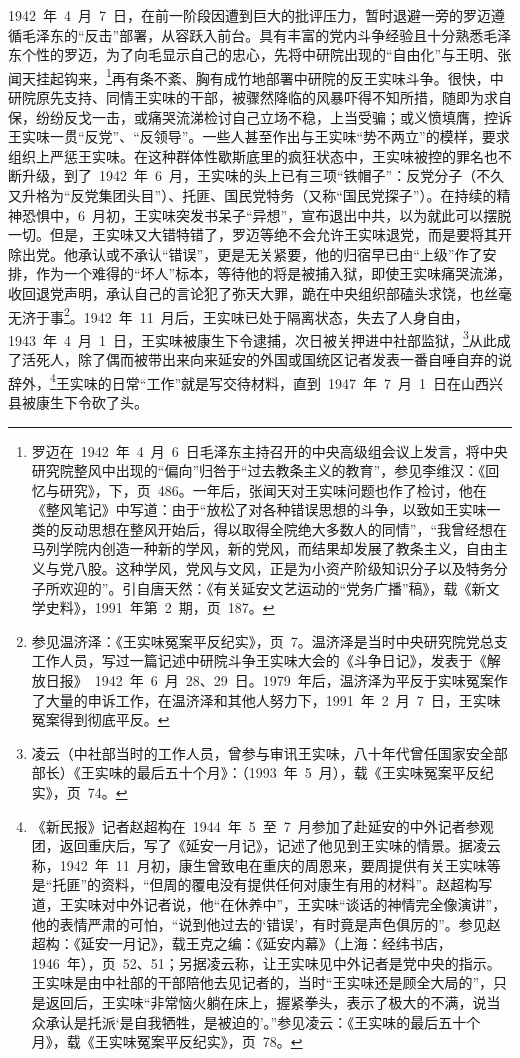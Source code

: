 1942~年~4~月~7~日，在前一阶段因遭到巨大的批评压力，暂时退避一旁的罗迈遵循毛泽东的“反击”部署，从容跃入前台。具有丰富的党内斗争经验且十分熟悉毛泽东个性的罗迈，为了向毛显示自己的忠心，先将中研院出现的“自由化”与王明、张闻天挂起钩来，\footnote{罗迈在~1942~年~4~月~6~日毛泽东主持召开的中央高级组会议上发言，将中央研究院整风中出现的“偏向”归咎于“过去教条主义的教育”，参见李维汉：《回忆与研究》，下，页~486。一年后，张闻天对王实味问题也作了检讨，他在《整风笔记》中写道：由于“放松了对各种错误思想的斗争，以致如王实味一类的反动思想在整风开始后，得以取得全院绝大多数人的同情”，“我曾经想在马列学院内创造一种新的学风，新的党风，而结果却发展了教条主义，自由主义与党八股。这种学风，党风与文风，正是为小资产阶级知识分子以及特务分子所欢迎的”。引自唐天然：《有关延安文艺运动的“党务广播”稿》，载《新文学史料》，1991~年第~2~期，页~187。}再有条不紊、胸有成竹地部署中研院的反王实味斗争。很快，中研院原先支持、同情王实味的干部，被骤然降临的风暴吓得不知所措，随即为求自保，纷纷反戈一击，或痛哭流涕检讨自己立场不稳，上当受骗；或义愤填膺，控诉王实味一贯“反党”、“反领导”。一些人甚至作出与王实味“势不两立”的模样，要求组织上严惩王实味。在这种群体性歇斯底里的疯狂状态中，王实味被控的罪名也不断升级，到了~1942~年~6~月，王实味的头上已有三项“铁帽子”：反党分子（不久又升格为“反党集团头目”）、托匪、国民党特务（又称“国民党探子”）。在持续的精神恐惧中，6~月初，王实味突发书呆子“异想”，宣布退出中共，以为就此可以摆脱一切。但是，王实味又大错特错了，罗迈等绝不会允许王实味退党，而是要将其开除出党。他承认或不承认“错误”，更是无关紧要，他的归宿早已由“上级”作了安排，作为一个难得的“坏人”标本，等待他的将是被捕入狱，即使王实味痛哭流涕，收回退党声明，承认自己的言论犯了弥天大罪，跪在中央组织部磕头求饶，也丝毫无济于事\footnote{参见温济泽：《王实味冤案平反纪实》，页~7。温济泽是当时中央研究院党总支工作人员，写过一篇记述中研院斗争王实味大会的《斗争日记》，发表于《解放日报》~1942~年~6~月~28、29~日。1979~年后，温济泽为平反于实味冤案作了大量的申诉工作，在温济泽和其他人努力下，1991~年~2~月~7~日，王实味冤案得到彻底平反。}。1942~年~11~月后，王实味已处于隔离状态，失去了人身自由，1943~年~4~月~1~日，王实味被康生下令逮捕，次日被关押进中社部监狱，\footnote{凌云（中社部当时的工作人员，曾参与审讯王实味，八十年代曾任国家安全部部长）《王实味的最后五十个月》：（1993~年~5~月），载《王实味冤案平反纪实》，页~74。}从此成了活死人，除了偶而被带出来向来延安的外国或国统区记者发表一番自唾自弃的说辞外，\footnote{《新民报》记者赵超构在~1944~年~5~至~7~月参加了赴延安的中外记者参观团，返回重庆后，写了《延安一月记》，记述了他见到王实味的情景。据凌云称，1942~年~11~月初，康生曾致电在重庆的周恩来，要周提供有关王实味等是“托匪”的资料，“但周的覆电没有提供任何对康生有用的材料”。赵超构写道，王实味对中外记者说，他“在休养中”，王实味“谈话的神情完全像演讲”，他的表情严肃的可怕，“说到他过去的‘错误’，有时竟是声色俱厉的”。参见赵超构：《延安一月记》，载王克之编：《延安内幕》（上海：经纬书店，1946~年），页~52、51；另据凌云称，让王实味见中外记者是党中央的指示。王实味是由中社部的干部陪他去见记者的，当时“王实味还是顾全大局的”，只是返回后，王实味“非常恼火躺在床上，握紧拳头，表示了极大的不满，说当众承认是托派‘是自我牺牲，是被迫的’。”参见凌云：《王实味的最后五十个月》，载《王实味冤案平反纪实》，页~78。}王实味的日常“工作”就是写交待材料，直到~1947~年~7~月~1~日在山西兴县被康生下令砍了头。

